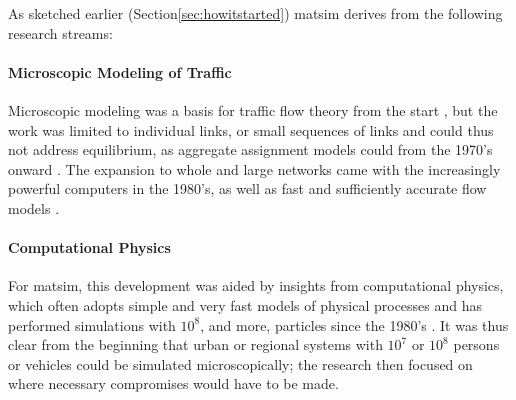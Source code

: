 As sketched earlier 
(Section\ref{sec:howitstarted})
\gls{matsim} derives from the following research streams:

\paragraph{Microscopic Modeling of Traffic} 
Microscopic modeling was
a basis for traffic flow 
theory from the start 
\citep[e.g.,][]{theGang,Seddon_Simulation_1972,Wiedemann_PhDThesis_1974}, but the work was 
limited to individual links, or small sequences of links and could thus not address equilibrium, as aggregate assignment models could from the 1970’s onward \citep[see][]{Sheffi_1985,OrtuzarWillumsen_2011}. The expansion to whole and large networks came with the increasingly powerful computers in the 1980’s, as well as fast and sufficiently accurate flow models \citep[e.g.,][]{Schwerdtfeger_VolmulerHamerslag_1984, NagelSchreckenberg1992CA, Daganzo_TransResPartB_1994,Gawron_IJMPC_1998}.

\paragraph{Computational Physics} 
For \gls{matsim}, this development was aided by insights from computational physics, which often adopts simple and very fast models of physical processes and has performed simulations with $10^8$, and more, particles since the 1980's \citep[for a contemporary review see][]{BeazleyEtcMolec-dyn}.
It was thus clear from the beginning that urban or regional systems with $10^7$ or $10^8$ persons or vehicles could be simulated microscopically; the research then focused on where necessary compromises would have to be made.

